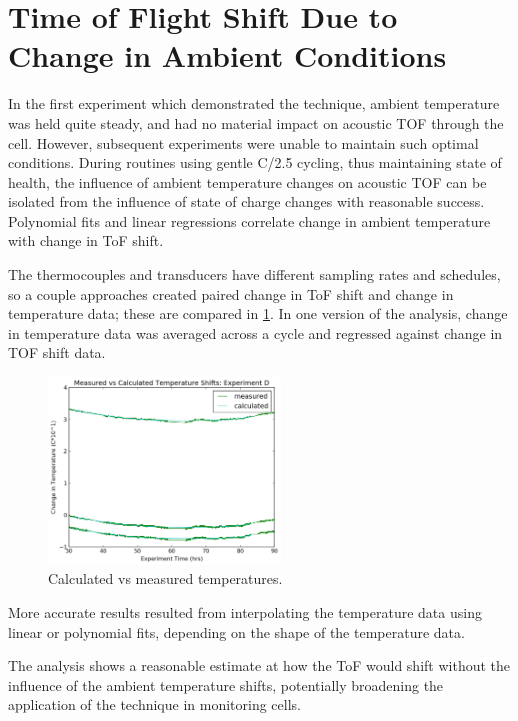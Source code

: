 \section{Time of Flight Shift Due to Change in Ambient Conditions}
In the first experiment which demonstrated the technique, ambient temperature was held quite steady, and had no material impact on acoustic TOF through the cell. 
However, subsequent experiments were unable to maintain such optimal conditions.
During routines using gentle C/2.5 cycling, thus maintaining state of health, the influence of ambient temperature changes on acoustic TOF can be isolated from the influence of state of charge changes with reasonable success. 
Polynomial fits and linear regressions correlate change in ambient temperature with change in ToF shift. 

The thermocouples and transducers have different sampling rates and schedules, so a couple approaches created paired change in ToF shift and change in temperature data; these are compared in \hyperref[fig:0417temp]{\cref{fig:0417temp}}. 
In one version of the analysis, change in temperature data was averaged across a cycle and regressed against change in TOF shift data. 
\begin{figure}[t]\label{fig:0417temp}
    \includegraphics[width=0.55\textwidth]{0417temp.png}
    \centering
    \caption{Calculated vs measured temperatures.}
\end{figure}
More accurate results resulted from interpolating the temperature data using linear or polynomial fits, depending on the shape of the temperature data.

The analysis shows a reasonable estimate at how the ToF would shift without the influence of the ambient temperature shifts, potentially broadening the application of the technique in monitoring cells.

